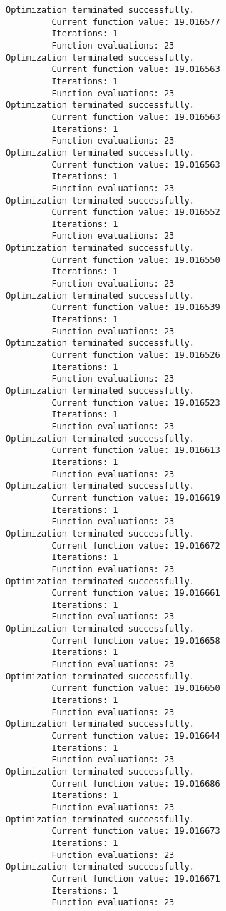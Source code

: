 \documentclass[11pt]{article}
\begin{document}
\begin{Verbatim}[commandchars=\\\{\}]
Optimization terminated successfully.
         Current function value: 19.016577
         Iterations: 1
         Function evaluations: 23
Optimization terminated successfully.
         Current function value: 19.016563
         Iterations: 1
         Function evaluations: 23
Optimization terminated successfully.
         Current function value: 19.016563
         Iterations: 1
         Function evaluations: 23
Optimization terminated successfully.
         Current function value: 19.016563
         Iterations: 1
         Function evaluations: 23
Optimization terminated successfully.
         Current function value: 19.016552
         Iterations: 1
         Function evaluations: 23
Optimization terminated successfully.
         Current function value: 19.016550
         Iterations: 1
         Function evaluations: 23
Optimization terminated successfully.
         Current function value: 19.016539
         Iterations: 1
         Function evaluations: 23
Optimization terminated successfully.
         Current function value: 19.016526
         Iterations: 1
         Function evaluations: 23
Optimization terminated successfully.
         Current function value: 19.016523
         Iterations: 1
         Function evaluations: 23
Optimization terminated successfully.
         Current function value: 19.016613
         Iterations: 1
         Function evaluations: 23
Optimization terminated successfully.
         Current function value: 19.016619
         Iterations: 1
         Function evaluations: 23
Optimization terminated successfully.
         Current function value: 19.016672
         Iterations: 1
         Function evaluations: 23
Optimization terminated successfully.
         Current function value: 19.016661
         Iterations: 1
         Function evaluations: 23
Optimization terminated successfully.
         Current function value: 19.016658
         Iterations: 1
         Function evaluations: 23
Optimization terminated successfully.
         Current function value: 19.016650
         Iterations: 1
         Function evaluations: 23
Optimization terminated successfully.
         Current function value: 19.016644
         Iterations: 1
         Function evaluations: 23
Optimization terminated successfully.
         Current function value: 19.016686
         Iterations: 1
         Function evaluations: 23
Optimization terminated successfully.
         Current function value: 19.016673
         Iterations: 1
         Function evaluations: 23
Optimization terminated successfully.
         Current function value: 19.016671
         Iterations: 1
         Function evaluations: 23

\end{Verbatim}
\end{document}
